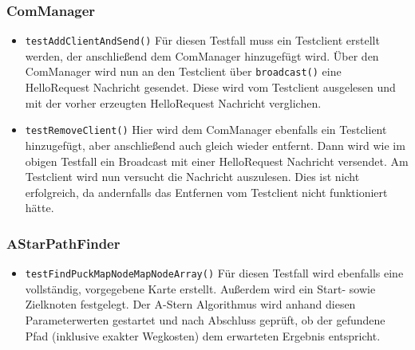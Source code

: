 \documentclass[10pt,a4paper]{article}
\begin{document}
			\subsubsection{ComManager}
			\begin{itemize}
				\item \texttt{testAddClientAndSend()}
				Für diesen Testfall muss ein Testclient erstellt werden, der anschließend dem ComManager hinzugefügt wird. Über den ComManager wird nun an den Testclient über 									\texttt{broadcast()} eine HelloRequest Nachricht gesendet. Diese wird vom Testclient ausgelesen und mit der vorher erzeugten HelloRequest Nachricht verglichen.		
				
				\item \texttt{testRemoveClient()}
				Hier wird dem ComManager ebenfalls ein Testclient hinzugefügt, aber anschließend auch gleich wieder entfernt. Dann wird wie im obigen Testfall ein Broadcast mit einer 							HelloRequest Nachricht versendet. Am Testclient wird nun versucht die Nachricht auszulesen. Dies ist nicht erfolgreich, da andernfalls das Entfernen vom Testclient nicht 						funktioniert hätte.
			\end{itemize}
			
			\subsubsection{AStarPathFinder}
			\begin{itemize}
				\item \texttt{testFindPuckMapNodeMapNodeArray()} 
				Für diesen Testfall wird ebenfalls eine vollständig, vorgegebene Karte erstellt. Außerdem wird ein Start- sowie Zielknoten festgelegt. Der A-Stern Algorithmus wird anhand 						diesen Parameterwerten gestartet und nach Abschluss geprüft, ob der gefundene Pfad (inklusive exakter Wegkosten) dem erwarteten Ergebnis entspricht.
			\end{itemize}
			
\end{document}
